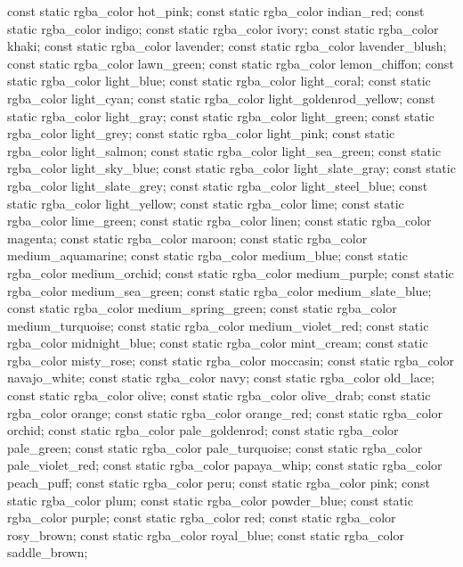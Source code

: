 \begin{codeblock}
{{{{{    const static rgba_color hot_pink;
    const static rgba_color indian_red;
    const static rgba_color indigo;
    const static rgba_color ivory;
    const static rgba_color khaki;
    const static rgba_color lavender;
    const static rgba_color lavender_blush;
    const static rgba_color lawn_green;
    const static rgba_color lemon_chiffon;
    const static rgba_color light_blue;
    const static rgba_color light_coral;
    const static rgba_color light_cyan;
    const static rgba_color light_goldenrod_yellow;
    const static rgba_color light_gray;
    const static rgba_color light_green;
    const static rgba_color light_grey;
    const static rgba_color light_pink;
    const static rgba_color light_salmon;
    const static rgba_color light_sea_green;
    const static rgba_color light_sky_blue;
    const static rgba_color light_slate_gray;
    const static rgba_color light_slate_grey;
    const static rgba_color light_steel_blue;
    const static rgba_color light_yellow;
    const static rgba_color lime;
    const static rgba_color lime_green;
    const static rgba_color linen;
    const static rgba_color magenta;
    const static rgba_color maroon;
    const static rgba_color medium_aquamarine;
    const static rgba_color medium_blue;
    const static rgba_color medium_orchid;
    const static rgba_color medium_purple;
    const static rgba_color medium_sea_green;
    const static rgba_color medium_slate_blue;
    const static rgba_color medium_spring_green;
    const static rgba_color medium_turquoise;
    const static rgba_color medium_violet_red;
    const static rgba_color midnight_blue;
    const static rgba_color mint_cream;
    const static rgba_color misty_rose;
    const static rgba_color moccasin;
    const static rgba_color navajo_white;
    const static rgba_color navy;
    const static rgba_color old_lace;
    const static rgba_color olive;
    const static rgba_color olive_drab;
    const static rgba_color orange;
    const static rgba_color orange_red;
    const static rgba_color orchid;
    const static rgba_color pale_goldenrod;
    const static rgba_color pale_green;
    const static rgba_color pale_turquoise;
    const static rgba_color pale_violet_red;
    const static rgba_color papaya_whip;
    const static rgba_color peach_puff;
    const static rgba_color peru;
    const static rgba_color pink;
    const static rgba_color plum;
    const static rgba_color powder_blue;
    const static rgba_color purple;
    const static rgba_color red;
    const static rgba_color rosy_brown;
    const static rgba_color royal_blue;
    const static rgba_color saddle_brown;
}}}}}
\end{codeblock}
